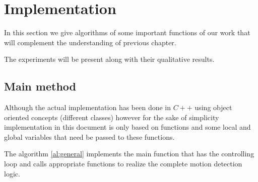 \section{Implementation}

In this section we give algorithms of some important functions of our work that will complement the understanding of previous chapter.

The experiments will be present along with their qualitative results.

\subsection{Main method}
Although the actual implementation has been done in $C++$ using object oriented concepts (different classes) however for the sake of simplicity implementation in this document is only based on functions and some local and global variables that need be passed to these functions.

The algorithm \ref{al:general} implements the main function that has the controlling loop and calls appropriate functions to realize the complete motion detection logic.


